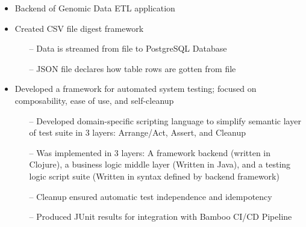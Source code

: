 \documentclass[10pt,a4paper]{altacv}
\begin{document}
\begin{itemize}
    \item Backend of Genomic Data ETL application
    \item Created CSV file digest framework
    \begin{itemize}
      \item[--] Data is streamed from file to PostgreSQL Database
      \item[--] JSON file declares how table rows are gotten from file
    \end{itemize}
    \item Developed a framework for automated system testing; focused on composability, ease of use, and self-cleanup
    \begin{itemize}
      \item[--] Developed domain-specific scripting language to simplify semantic layer of test suite in 3 layers: Arrange/Act, Assert, and Cleanup
      \item[--] Was implemented in 3 layers: A framework backend (written in Clojure), a business logic middle layer (Written in Java), and a testing logic script suite (Written in syntax defined by backend framework)
      \item[--] Cleanup ensured automatic test independence and idempotency
      \item[--] Produced JUnit results for integration with Bamboo CI/CD Pipeline
\end{itemize}

\bigskip


\divider

\begin{itemize}
\end{itemize}


\end{itemize}
\end{document}
